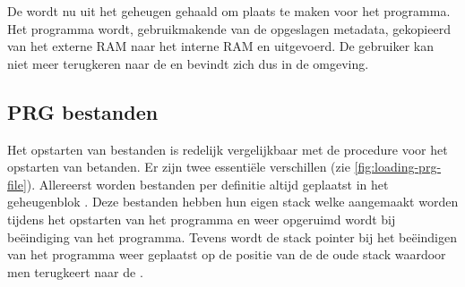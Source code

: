 De \launcher wordt nu uit het geheugen gehaald om plaats te maken voor het \cas programma. Het programma wordt, gebruikmakende van de opgeslagen metadata, gekopieerd van het externe RAM naar het interne RAM en uitgevoerd. De gebruiker kan niet meer terugkeren naar de \launcher en bevindt zich dus in de \basic omgeving.

%
%
\subsection{PRG bestanden}


Het opstarten van \prg bestanden is redelijk vergelijkbaar met de procedure voor het opstarten van \cas betanden. Er zijn twee essentiële verschillen (zie \cref{fig:loading-prg-file}). Allereerst worden \prg bestanden per definitie altijd geplaatst in het geheugenblok . Deze \prg bestanden hebben hun eigen stack welke aangemaakt worden tijdens het opstarten van het programma en weer opgeruimd wordt bij beëindiging van het programma. Tevens wordt de stack pointer bij het beëindigen van het programma weer geplaatst op de positie van de de oude stack waardoor men terugkeert naar de \launcher.

